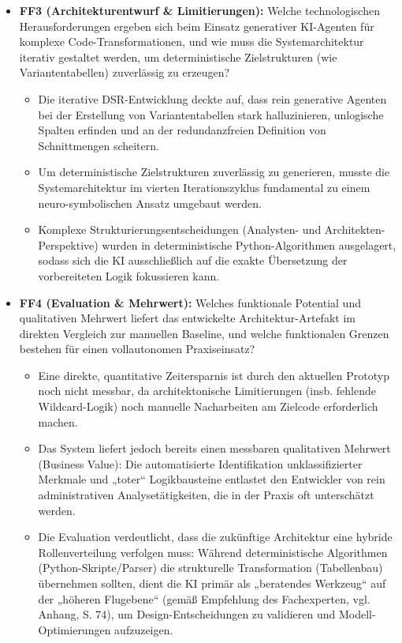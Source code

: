 \begin{itemize}
\item \textbf{\ac{FF}3 (Architekturentwurf \& Limitierungen):} Welche technologischen Herausforderungen ergeben sich beim Einsatz generativer KI-Agenten für komplexe Code-Transformationen, und wie muss die Systemarchitektur iterativ gestaltet werden, um deterministische Zielstrukturen (wie Variantentabellen) zuverlässig zu erzeugen?
\begin{itemize}
    \item Die iterative \ac{DSR}-Entwicklung deckte auf, dass rein generative Agenten bei der Erstellung von Variantentabellen stark halluzinieren, unlogische Spalten erfinden und an der redundanzfreien Definition von Schnittmengen scheitern.
    \item Um deterministische Zielstrukturen zuverlässig zu generieren, musste die Systemarchitektur im vierten Iterationszyklus fundamental zu einem neuro-symbolischen Ansatz umgebaut werden.
    \item Komplexe Strukturierungsentscheidungen (Analysten- und Architekten-Perspektive) wurden in deterministische Python-Algorithmen ausgelagert, sodass sich die \ac{KI} ausschließlich auf die exakte Übersetzung der vorbereiteten Logik fokussieren kann.
\end{itemize}

\item \textbf{\ac{FF}4 (Evaluation \& Mehrwert):} Welches funktionale Potential und qualitativen Mehrwert liefert das entwickelte Architektur-Artefakt im direkten Vergleich zur manuellen Baseline, und welche funktionalen Grenzen bestehen für einen vollautonomen Praxiseinsatz?
\begin{itemize}
    \item Eine direkte, quantitative Zeitersparnis ist durch den aktuellen Prototyp noch nicht messbar, da architektonische Limitierungen (insb. fehlende Wildcard-Logik) noch manuelle Nacharbeiten am Zielcode erforderlich machen.
    \item Das System liefert jedoch bereits einen messbaren qualitativen Mehrwert (Business Value): Die automatisierte Identifikation unklassifizierter Merkmale und „toter“ Logikbausteine entlastet den Entwickler von rein administrativen Analysetätigkeiten, die in der Praxis oft unterschätzt werden.
    \item Die Evaluation verdeutlicht, dass die zukünftige Architektur eine hybride Rollenverteilung verfolgen muss: Während deterministische Algorithmen (Python-Skripte/Parser) die strukturelle Transformation (Tabellenbau) übernehmen sollten, dient die \ac{KI} primär als „beratendes Werkzeug“ auf der „höheren Flugebene“ (gemäß Empfehlung des Fachexperten, vgl. Anhang, S. 74), um Design-Entscheidungen zu validieren und Modell-Optimierungen aufzuzeigen.
    \end{itemize}
\end{itemize}

